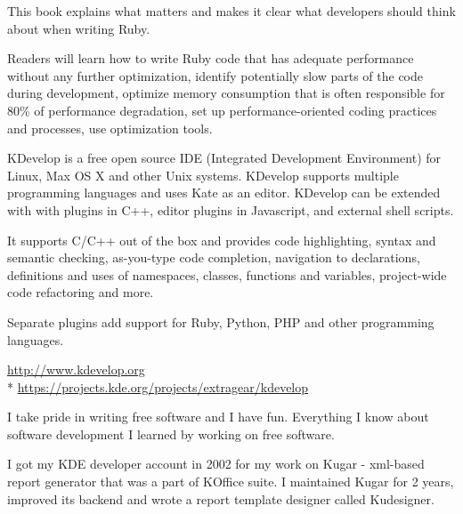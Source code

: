 \documentclass[12pt]{letter}
\begin{document}
\begin{llist}
           \item This book explains what matters and makes it clear what developers should think about when writing Ruby.

           \item Readers will learn how to write Ruby code that has adequate performance without any further optimization, identify potentially slow parts of the code during development, optimize memory consumption that is often responsible for 80\% of performance degradation, set up performance-oriented coding practices and processes, use optimization tools.

  \endexperience


  \location{}

  \startexperience

           \item KDevelop is a free open source IDE (Integrated Development Environment) for Linux, Max OS X and other Unix systems. KDevelop supports multiple programming languages and uses Kate as an editor. KDevelop can be extended with with plugins in C++, editor plugins in Javascript, and external shell scripts.

           \item It supports C/C++ out of the box and provides code highlighting, syntax and semantic checking,  as-you-type code completion, navigation to declarations, definitions and uses of namespaces, classes, functions and variables, project-wide code refactoring and more.

            \item Separate plugins add support for Ruby, Python, PHP and other programming languages.

            \item \url{http://www.kdevelop.org}\\*
                  \url{https://projects.kde.org/projects/extragear/kdevelop}

            \item I take pride in writing free software and I have fun. Everything I know about software development I learned by working on free software.

            \item I got my KDE developer account in 2002 for my work on Kugar - xml-based report generator that was a part of KOffice suite. I maintained Kugar for 2 years, improved its backend and wrote a report template designer called Kudesigner.


\end{llist}
\end{document}
